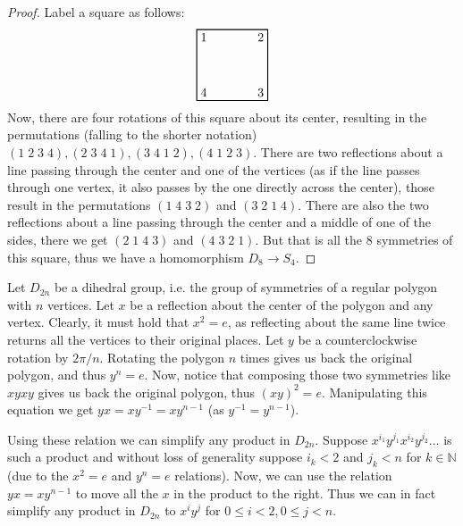 \begin{problem}
\end{problem}

\begin{proof}
	Label a square as follows:
	\begin{equation*}
	\begin{tikzpicture}
		\node[draw=black, thick,minimum width=2cm,minimum height=2cm] (rect) at (0,0) {};
		\foreach \anc/\n in {south west/4,north west/1,north east/2,south east/3}{
			\node[anchor=\anc] at (rect.\anc) {\n};
		}
	\end{tikzpicture}
	\end{equation*}
	Now, there are four rotations of this square about its center, resulting in the permutations (falling to the shorter notation) $(1\;2\;3\;4), (2\;3\;4\;1), (3\;4\;1\;2), (4\;1\;2\;3)$. There are two reflections about a line passing through the center and one of the vertices (as if the line passes through one vertex, it also passes by the one directly across the center), those result in the permutations $(1\;4\;3\;2)$ and $(3\;2\;1\;4)$. There are also the two reflections about a line passing through the center and a middle of one of the sides, there we get $(2\;1\;4\;3)$ and $(4\;3\;2\;1)$. But that is all the $8$ symmetries of this square, thus we have a homomorphism $D_8 \to S_4$.
\end{proof}

\begin{problem}
\end{problem}

\begin{solution}
	Let $D_{2n}$ be a dihedral group, i.e. the group of symmetries of a regular polygon with $n$ vertices. Let $x$ be a reflection about the center of the polygon and any vertex. Clearly, it must hold that $x^2 = e$, as reflecting about the same line twice returns all the vertices to their original places. Let $y$ be a counterclockwise rotation by $2\pi/n$. Rotating the polygon $n$ times gives us back the original polygon, and thus $y^n=e$.  Now, notice that composing those two symmetries like $xyxy$ gives us back the original polygon, thus $(xy)^2=e$. Manipulating this equation we get $yx=xy^{-1}=xy^{n-1}$ (as $y^{-1}=y^{n-1}$). 
	
	Using these relation we can simplify any product in $D_{2n}$. Suppose $x^{i_1}y^{j_1}x^{i_2}y^{j_2}\dots$ is such a product and without loss of generality suppose $i_k < 2$ and $j_k < n$ for $k \in \mathbb{N}$ (due to the $x^2=e$ and $y^n=e$ relations). Now, we can use the relation $yx = xy^{n-1}$ to move all the $x$ in the product to the right. Thus we can in fact simplify any product in $D_{2n}$ to $x^i y^j$ for $0 \leq i < 2, 0 \leq j < n$.
\end{solution}


